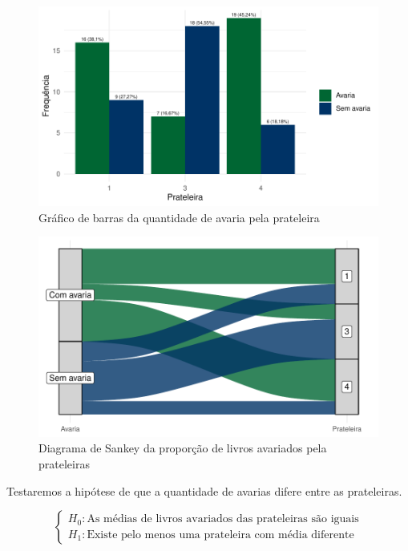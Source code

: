 \documentclass[a4paper, 12pt]{article}
\begin{document}
\begin{figure}[H]
    \centering
    \caption{Gráfico de barras da quantidade de avaria pela prateleira}
    \includegraphics[scale=1]{grafico5.pdf}
\end{figure}

\begin{figure}[H]
    \centering
    \caption{Diagrama de Sankey da proporção de livros avariados pela prateleiras}
    \includegraphics[scale=1]{grafico9.pdf}
\end{figure}

Testaremos a hipótese de que a quantidade de avarias difere entre as prateleiras.

$$\begin{cases}
H_0 : \mbox{As médias de livros avariados das prateleiras são iguais}\\
H_1 : \mbox{Existe pelo menos uma prateleira com média diferente}
\end{cases}$$\\
\end{document}
